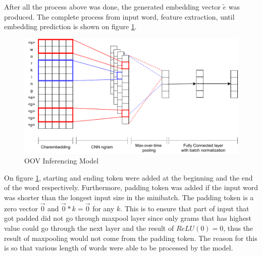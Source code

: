         After all the process above was done, the generated embedding
        vector $\tilde{e}$ was produced.
        The complete process from input word, feature extraction,
        until embedding prediction is shown on figure \ref{fig:model}.
        \begin{figure}
            \centering
            \includegraphics[width=.8\linewidth]{images/model_batchnorm.pdf}
            \caption{OOV Inferencing Model}
            \label{fig:model}
        \end{figure}
        On figure \ref{fig:model}, starting and ending token were
        added at the beginning and the end of the word respectively.
        Furthermore, padding token was added if the input word was
        shorter than the longest input size in the minibatch. The
        padding token is a zero vector $\vec{0}$ and $\vec{0} * k =
        \vec{0}$ for any $k$. This is to ensure that part of input
        that got padded did not go through maxpool layer since only
        grams that has highest value could go through the next layer
        and the result of $ReLU(0) = 0$, thus the result of maxpooling
        would not come from the padding token. The reason for this is
        so that various length of words were able to be processed by
        the model.

